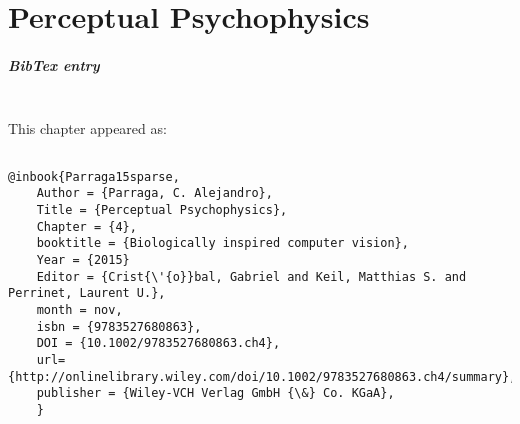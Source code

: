 \documentclass[a4paper, 11pt]{book}
\author{Perrinet}\title{\Title}
\begin{document}
%
%
\frontmatter
\mainmatter
\addtocounter{chapter}{3} %
\chapter{Perceptual Psychophysics}

\paragraph{BibTex entry}~~\\

This chapter appeared as: %
\begin{verbatim}

@inbook{Parraga15sparse,
	Author = {Parraga, C. Alejandro},
	Title = {Perceptual Psychophysics},
	Chapter = {4},
	booktitle = {Biologically inspired computer vision},
	Year = {2015}
	Editor = {Crist{\'{o}}bal, Gabriel and Keil, Matthias S. and Perrinet, Laurent U.},
	month = nov,
	isbn = {9783527680863},
	DOI = {10.1002/9783527680863.ch4},
	url={http://onlinelibrary.wiley.com/doi/10.1002/9783527680863.ch4/summary},
	publisher = {Wiley-VCH Verlag GmbH {\&} Co. KGaA},
	}
	
\end{verbatim}



\backmatter
\end{document}
